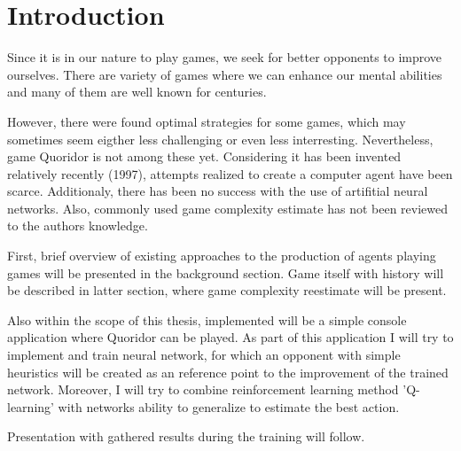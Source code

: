 \chapter{Introduction}\label{chap:1}

Since it is in our nature to play games, we seek for better opponents to
improve ourselves.
There are variety of games where we can enhance our mental abilities and many
of them are well known for centuries.

However, there were found optimal strategies for some games, which may
sometimes seem eigther less challenging or even less interresting.
Nevertheless, game Quoridor is not among these yet.
Considering it has been invented relatively recently (1997), attempts realized
to create a computer agent have been scarce.
Additionaly, there has been no success with the use of artifitial neural
networks.  Also, commonly used game complexity estimate has not been reviewed
to the authors knowledge.

First, brief overview of existing approaches to the production of agents
playing games will be presented in the background section.
Game itself with history will be described in latter section, where game
complexity reestimate will be present.

Also within the scope of this thesis, implemented will be a simple
console application where Quoridor can be played.
As part of this application I will try to implement and train neural network,
for which an opponent with simple heuristics will be created as an reference
point to the improvement of the trained network.
Moreover, I will try to combine reinforcement learning method 'Q-learning'
with networks ability to generalize to estimate the best action.

Presentation with gathered results during the training will follow.
